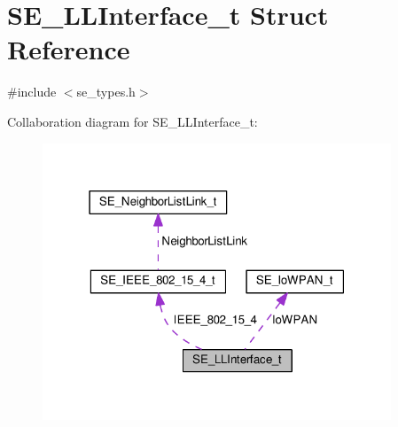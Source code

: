 \hypertarget{structSE__LLInterface__t}{}\section{S\+E\+\_\+\+L\+L\+Interface\+\_\+t Struct Reference}
\label{structSE__LLInterface__t}


{\ttfamily \#include $<$se\+\_\+types.\+h$>$}



Collaboration diagram for S\+E\+\_\+\+L\+L\+Interface\+\_\+t\+:\nopagebreak
\begin{figure}[H]
\begin{center}
\leavevmode
\includegraphics[width=295pt]{structSE__LLInterface__t__coll__graph}
\end{center}
\end{figure}
